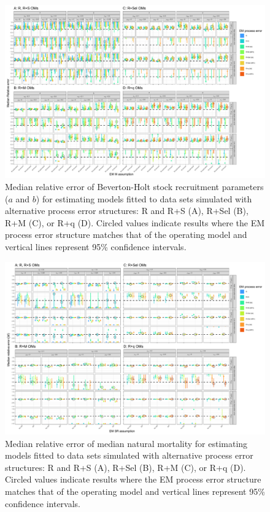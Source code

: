 \documentclass[
  12pt,
]{article}
\begin{document}
\begin{landscape}
\begin{figure}
\begin{center}
\includegraphics{sr_bias_plots}
\end{center}
\caption{Median relative error of Beverton-Holt stock recruitment parameters ($a$ and $b$) for estimating models fitted to data sets simulated with alternative process error structures: R and R+S (A), R+Sel (B), R+M (C), or R+q (D). Circled values indicate results where the EM process error structure matches that of the operating model and vertical lines represent 95\% confidence intervals.}\label{SR_rel_error}
\end{figure}
\end{landscape}

\begin{landscape}
\begin{figure}
\begin{center}
\includegraphics{M_bias_plots}
\end{center}
\caption{Median relative error of median natural mortality for estimating models fitted to data sets simulated with alternative process error structures: R and R+S (A), R+Sel (B), R+M (C), or R+q (D). Circled values indicate results where the EM process error structure matches that of the operating model and vertical lines represent 95\% confidence intervals.}\label{M_rel_error}
\end{figure}
\end{landscape}
\end{document}
